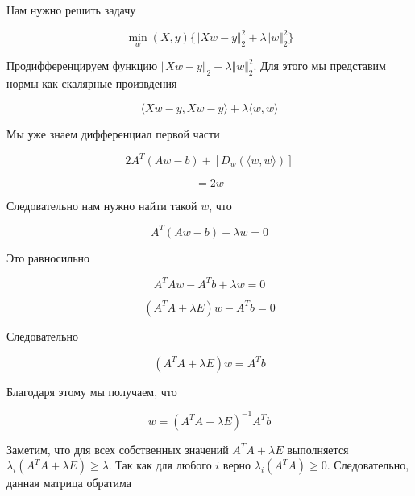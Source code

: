 \documentclass{article}
\begin{document}
    Нам нужно решить задачу

    \begin{equation}
        \min_{w}(X, y)\{ \Vert Xw - y \Vert_{2}^{2} + \lambda \Vert w \Vert_{2}^{2} \}
    \end{equation}

    Продифференцируем функцию $\Vert Xw - y \Vert_{2} + \lambda \Vert w \Vert_{2}^{2}$. Для этого 
    мы представим нормы как скалярные произвдения

    \begin{equation}
        \langle Xw - y,  Xw - y \rangle + \lambda \langle w, w \rangle
    \end{equation}

    Мы уже знаем дифференциал первой части

    \begin{equation}
        2 A^{T} (A w - b) + [D_{w}(\langle w, w \rangle)]
    \end{equation}

    \begin{equation}
        [D_{w}(\langle w, w \rangle)] = 2 w
    \end{equation}

    Следовательно нам нужно найти такой $w$, что 

    \begin{equation}
        A^{T} (A w - b) + \lambda w = 0
    \end{equation}

    Это равносильно

    \begin{equation}
        A^{T} A w - A^{T} b + \lambda w = 0
    \end{equation}

    \begin{equation}
        (A^{T} A + \lambda E)w - A^{T} b = 0
    \end{equation}

    Следовательно

    \begin{equation}
        (A^{T} A + \lambda E)w = A^{T} b
    \end{equation}

    Благодаря этому мы получаем, что 

    \begin{equation}
        w = (A^{T} A + \lambda E)^{-1}  A^{T} b
    \end{equation}

    Заметим, что для всех собственных значений $A^{T} A + \lambda E$ выполняется $\lambda_{i}(A^{T} A + \lambda E) \geq \lambda$. 
    Так как для любого $i$ верно $\lambda_{i}(A^{T} A) \geq 0$. Следовательно, данная матрица обратима
\end{document}
